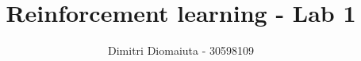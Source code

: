\documentclass[runningheads]{llncs}
\begin{document}
%
\title{Reinforcement learning - Lab 1}
%
%
\author{Dimitri Diomaiuta - 30598109}
%
%
%
\maketitle              %
%
%
%
%
\end{document}
